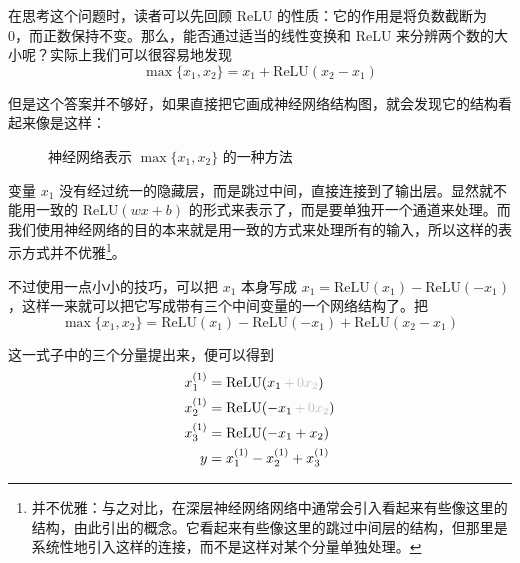 在思考这个问题时，读者可以先回顾 ReLU 的性质：它的作用是将负数截断为 0，而正数保持不变。那么，能否通过适当的线性变换和 ReLU 来分辨两个数的大小呢？实际上我们可以很容易地发现
\[
    \max\{x_1, x_2\} = x_1 + \text{ReLU}(x_2 - x_1)
\]

但是这个答案并不够好，如果直接把它画成神经网络结构图，就会发现它的结构看起来像是这样：
\begin{figure}[H]
    \centering
    \caption{神经网络表示 $\max\{x_1, x_2\}$ 的一种方法}
\end{figure}

变量 $x_1$ 没有经过统一的隐藏层，而是跳过中间，直接连接到了输出层。显然就不能用一致的 $\text{ReLU}(wx+b)$ 的形式来表示了，而是要单独开一个通道来处理。而我们使用神经网络的目的本来就是用一致的方式来处理所有的输入，所以这样的表示方式并不优雅\footnote{并不优雅：与之对比，在深层神经网络网络中通常会引入看起来有些像这里的结构，由此引出的概念。它看起来有些像这里的跳过中间层的结构，但那里是系统性地引入这样的连接，而不是这样对某个分量单独处理。}。

不过使用一点小小的技巧，可以把 $x_1$ 本身写成 $x_1 = \text{ReLU}(x_1) - \text{ReLU}(-x_1)$，这样一来就可以把它写成带有三个中间变量的一个网络结构了。把
\[
    \max\{x_1, x_2\} = \text{ReLU}(x_1) - \text{ReLU}(-x_1) + \text{ReLU}(x_2 - x_1)
\]

这一式子中的三个分量提出来，便可以得到
\[
    \begin{aligned}
        x_1^{(1)} & = \text{ReLU}(x_1\,{\color{lightgray}+\,0x_2})  \\
        x_2^{(1)} & = \text{ReLU}(-x_1\,{\color{lightgray}+\,0x_2}) \\
        x_3^{(1)} & = \text{ReLU}(- x_1 + x_2)                      \\
        y         & = x_1^{(1)} - x_2^{(1)} + x_3^{(1)}
    \end{aligned}
\]

